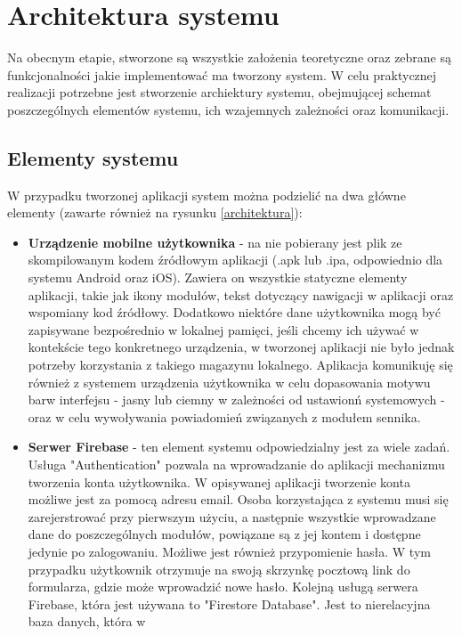 \section{Architektura systemu}
Na obecnym etapie, stworzone są wszystkie założenia teoretyczne oraz zebrane są
funkcjonalności jakie implementować ma tworzony system. W celu praktycznej
realizacji potrzebne jest stworzenie archiektury systemu, obejmującej schemat
poszczególnych elementów systemu, ich wzajemnych zależności oraz komunikacji.

\subsection{Elementy systemu}
W przypadku tworzonej aplikacji system można podzielić na dwa główne elementy (zawarte również na rysunku \ref{architektura}):
\begin{itemize}
    \item \textbf{Urządzenie mobilne użytkownika} - na nie pobierany jest plik
    ze skompilowanym kodem źródłowym aplikacji (.apk lub .ipa, odpowiednio dla
    systemu Android oraz iOS). Zawiera on wszystkie statyczne elementy
    aplikacji, takie jak ikony modułów, tekst dotyczący nawigacji w aplikacji
    oraz wspomiany kod źródłowy. Dodatkowo niektóre dane użytkownika mogą być
    zapisywane bezpośrednio w lokalnej pamięci, jeśli chcemy ich używać w
    kontekście tego konkretnego urządzenia, w tworzonej aplikacji nie było
    jednak potrzeby korzystania z takiego magazynu lokalnego. Aplikacja
    komunikuję się również z systemem urządzenia użytkownika w celu dopasowania
    motywu barw interfejsu - jasny lub ciemny w zależności od ustawionń
    systemowych - oraz w celu wywoływania powiadomień związanych z modułem
    sennika.
    \item \textbf{Serwer Firebase} - ten element systemu odpowiedzialny jest za
    wiele zadań. Usługa "Authentication" pozwala na wprowadzanie do aplikacji
    mechanizmu tworzenia konta użytkownika. W opisywanej aplikacji tworzenie
    konta możliwe jest za pomocą adresu email. Osoba korzystająca z systemu musi
    się zarejerstrować przy pierwszym użyciu, a następnie wszystkie wprowadzane
    dane do poszczególnych modułów, powiązane są z jej kontem i dostępne jedynie
    po zalogowaniu. Możliwe jest również przypomienie hasła. W tym przypadku
    użytkownik otrzymuje na swoją skrzynkę pocztową link do formularza, gdzie
    może wprowadzić nowe hasło. Kolejną usługą serwera Firebase, która jest
    używana to "Firestore Database". Jest to nierelacyjna baza danych, która w

\end{itemize}
